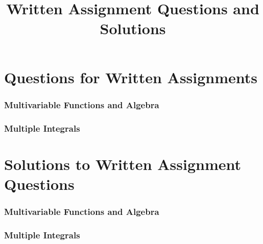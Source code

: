 \documentclass{article}
\title{Written Assignment Questions and Solutions}
\date{}
\author{}
\begin{document}
\maketitle
\tableofcontents 

\newpage
\part{Questions for Written Assignments}

\setcounter{section}{1}

\section{Multivariable Functions and Algebra}

\newpage %

\newpage %

\newpage %


\newpage %

%

\newpage %
\section{Multiple Integrals}


\newpage
\part{Solutions to Written Assignment Questions}
\setcounter{section}{1}

\section{Multivariable Functions and Algebra}

\newpage %

\newpage %

\newpage %

\newpage %


\section{Multiple Integrals}

\end{document}
